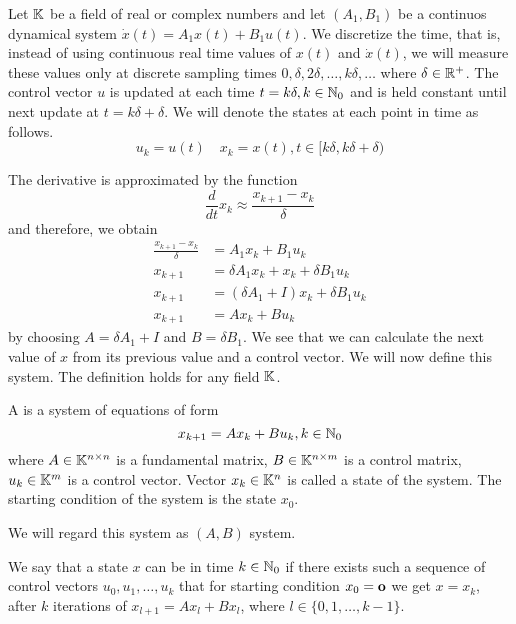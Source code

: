 Let $\mathbb{K}$ be a field of real or complex numbers and let $(A_1,B_1)$ be a continuos dynamical system $\dot{x}(t)=A_1x(t)+B_1u(t)$. We discretize the time, that is, instead of using continuous real time values of $x(t)$ and $\dot{x}(t)$, we will measure these values only at discrete sampling times $0,\delta,2\delta,\ldots,k\delta,\ldots$ where $\delta\in\mathbb{R}^+$. The control vector $u$ is updated at each time $t=k\delta, k\in\mathbb{N}_0$ and is held constant until next update at $t=k\delta+\delta$. We will denote the states at each point in time as follows. 
$$u_k=u(t)\quad x_k=x(t),t\in[k\delta,k\delta+\delta)$$

The derivative is approximated by the function 
$$\frac{d}{dt}x_k\approx\frac{x_{k+1}-x_k}{\delta}$$
and therefore, we obtain 
\begin{align*}
	\frac{x_{k+1}-x_k}{\delta}&=A_1x_k+B_1u_k \\
	x_{k+1}&=\delta A_1x_k+x_k+\delta B_1u_k \\
	x_{k+1}&=(\delta A_1+I)x_k+\delta B_1u_k \\
	x_{k+1}&=Ax_k+Bu_k
\end{align*}
by choosing $A=\delta A_1+I$ and $B=\delta B_1$. We see that we can calculate the next value of $x$ from its previous value and a control vector. We will now define this system. The definition holds for any field $\mathbb{K}$.

\begin{definition}
	A  is a system of equations of form 
	$$x_{k+1}=Ax_k+Bu_k,k\in\mathbb{N}_0$$
	where $A\in\mathbb{K}^{n\times n}$ is a fundamental matrix, $B\in\mathbb{K}^{n\times m}$ is a control matrix, $u_k\in\mathbb{K}^m$ is a control vector. Vector $x_k\in\mathbb{K}^n$ is called a state of the system. The starting condition of the system is the state $x_0$.

	We will regard this system as $(A,B)$ system.
\end{definition}

\begin{definition}
	We say that a state $x$ can be  in time $k\in\mathbb{N}_0$ if there exists such a sequence of control vectors $u_0,u_1,\ldots,u_k$ that for starting condition $x_0=\textbf{o}$ we get $x=x_k$, after $k$ iterations of $x_{l+1}=Ax_l+Bx_l$, where $l\in\{0,1,\ldots,k-1\}$.
\end{definition}

